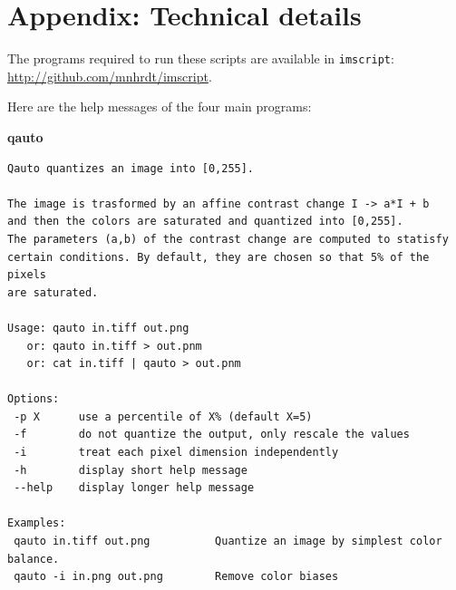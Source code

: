 %
%

\section{Appendix: Technical details}

The programs required to run these scripts are available in \verb+imscript+:
\url{http://github.com/mnhrdt/imscript}.

Here are the help messages of the four main programs:

{\bf qauto}
 \begin{verbatim}
Qauto quantizes an image into [0,255].

The image is trasformed by an affine contrast change I -> a*I + b
and then the colors are saturated and quantized into [0,255].
The parameters (a,b) of the contrast change are computed to statisfy
certain conditions. By default, they are chosen so that 5% of the pixels
are saturated.

Usage: qauto in.tiff out.png
   or: qauto in.tiff > out.pnm
   or: cat in.tiff | qauto > out.pnm

Options:
 -p X      use a percentile of X% (default X=5)
 -f        do not quantize the output, only rescale the values
 -i        treat each pixel dimension independently
 -h        display short help message
 --help    display longer help message

Examples:
 qauto in.tiff out.png          Quantize an image by simplest color balance.
 qauto -i in.png out.png        Remove color biases
 \end{verbatim}

